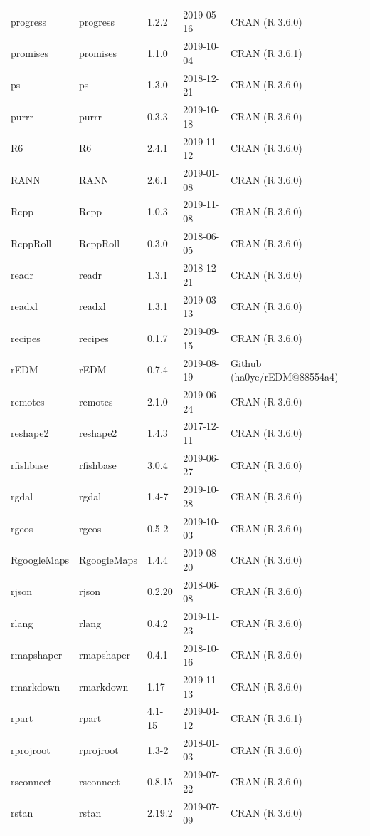 \documentclass[]{article}
\begin{document}
\begin{longtable}[t]{lllll}
progress & progress & 1.2.2 & 2019-05-16 & CRAN (R 3.6.0)\\
\addlinespace
promises & promises & 1.1.0 & 2019-10-04 & CRAN (R 3.6.1)\\
ps & ps & 1.3.0 & 2018-12-21 & CRAN (R 3.6.0)\\
purrr & purrr & 0.3.3 & 2019-10-18 & CRAN (R 3.6.0)\\
R6 & R6 & 2.4.1 & 2019-11-12 & CRAN (R 3.6.0)\\
RANN & RANN & 2.6.1 & 2019-01-08 & CRAN (R 3.6.0)\\
\addlinespace
Rcpp & Rcpp & 1.0.3 & 2019-11-08 & CRAN (R 3.6.0)\\
RcppRoll & RcppRoll & 0.3.0 & 2018-06-05 & CRAN (R 3.6.0)\\
readr & readr & 1.3.1 & 2018-12-21 & CRAN (R 3.6.0)\\
readxl & readxl & 1.3.1 & 2019-03-13 & CRAN (R 3.6.0)\\
recipes & recipes & 0.1.7 & 2019-09-15 & CRAN (R 3.6.0)\\
\addlinespace
rEDM & rEDM & 0.7.4 & 2019-08-19 & Github (ha0ye/rEDM@88554a4)\\
remotes & remotes & 2.1.0 & 2019-06-24 & CRAN (R 3.6.0)\\
reshape2 & reshape2 & 1.4.3 & 2017-12-11 & CRAN (R 3.6.0)\\
rfishbase & rfishbase & 3.0.4 & 2019-06-27 & CRAN (R 3.6.0)\\
rgdal & rgdal & 1.4-7 & 2019-10-28 & CRAN (R 3.6.0)\\
\addlinespace
rgeos & rgeos & 0.5-2 & 2019-10-03 & CRAN (R 3.6.0)\\
RgoogleMaps & RgoogleMaps & 1.4.4 & 2019-08-20 & CRAN (R 3.6.0)\\
rjson & rjson & 0.2.20 & 2018-06-08 & CRAN (R 3.6.0)\\
rlang & rlang & 0.4.2 & 2019-11-23 & CRAN (R 3.6.0)\\
rmapshaper & rmapshaper & 0.4.1 & 2018-10-16 & CRAN (R 3.6.0)\\
\addlinespace
rmarkdown & rmarkdown & 1.17 & 2019-11-13 & CRAN (R 3.6.0)\\
rpart & rpart & 4.1-15 & 2019-04-12 & CRAN (R 3.6.1)\\
rprojroot & rprojroot & 1.3-2 & 2018-01-03 & CRAN (R 3.6.0)\\
rsconnect & rsconnect & 0.8.15 & 2019-07-22 & CRAN (R 3.6.0)\\
rstan & rstan & 2.19.2 & 2019-07-09 & CRAN (R 3.6.0)\\

\end{longtable}
\end{document}
